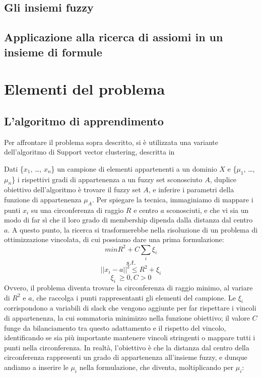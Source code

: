 \documentclass[12pt,a4paper]{report}
\begin{document}
\section{Gli insiemi fuzzy}
\section{Applicazione alla ricerca di assiomi in un insieme di formule}

\chapter{Elementi del problema}
\section{L'algoritmo di apprendimento}
Per affrontare il problema sopra descritto, si è utilizzata una variante dell'algoritmo di Support vector clustering, descritta in \cite{svpaper}

Dati \{$x_1$, \dots , $x_n$\} un campione di elementi appartenenti a un dominio $X$ e  \{$\mu_1$, \dots , $\mu_n$\} i rispettivi gradi di appartenenza a un fuzzy set sconosciuto $A$, duplice obiettivo dell'algoritmo è trovare il fuzzy set $A$,  e inferire i parametri della funzione di appartenenza $\mu_A$. Per spiegare la tecnica, immaginiamo di mappare i punti  $x_i$ su una circonferenza di raggio $R$  e centro $a$ sconosciuti, e che vi sia un modo di far sì che il  loro  grado di membership dipenda dalla distanza dal centro $a$.
A questo punto, la ricerca si trasformerebbe nella risoluzione di un problema di ottimizzazione vincolata, di cui possiamo dare una prima formulazione:
\[ min R^2 + C\sum_{i} \xi_{i}\]
\[s.t.\]
\[||x_i - a||^2  \leq R^2 + \xi_{i}\]
\[ \xi_{i}\ \geq 0, C > 0\]
Ovvero, il problema diventa trovare la circonferenza di raggio minimo, al variare di $R^2$ e $a$, che raccolga i punti rappresentanti gli elementi del campione.
Le $\xi_i$ corrispondono a variabili di slack che vengono aggiunte per far rispettare i vincoli di appartenenza, la cui sommatoria minimizzo nella funzione obiettivo; il valore $C$ funge da bilanciamento tra questo adattamento e il rispetto del vincolo, identificando se sia più importante mantenere vincoli stringenti o mappare tutti i punti nella circonferenza.
In realtà, l'obiettivo è che la distanza dal centro della circonferenza rappresenti un grado di appartenenza all'insieme fuzzy, e dunque andiamo a inserire le $\mu_i$ nella formulazione, che diventa, moltiplicando per $\mu_i$:
\end{document}
